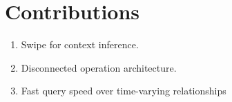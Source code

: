 \documentclass[10pt,print,letterpaper]{sigplan-proc-varsize}
\begin{document}
%
\author{
%
%
\alignauthor
}


\maketitle

\section{Contributions}
\begin{enumerate}
\item Swipe for context inference.
\item Disconnected operation architecture.
\item Fast query speed over time-varying relationships
\end{enumerate}
\end{document}
